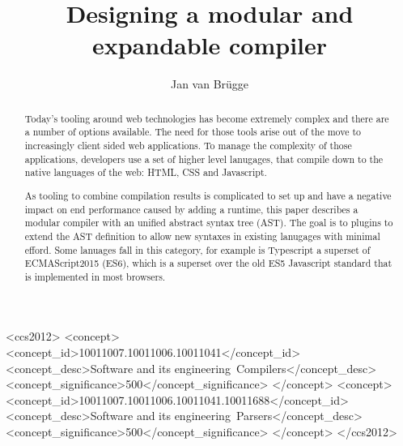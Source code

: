\documentclass[sigconf]{acmart}
\begin{document}
\title{Designing a modular and expandable compiler}

\author{Jan van Br\"ugge}

\begin{abstract}
Today's tooling around web technologies has become extremely complex and there are a number of options available. The need for those tools arise out of the move to increasingly client sided web applications. To manage the complexity of those applications, developers use a set of higher level lanugages, that compile down to the native languages of the web: HTML, CSS and Javascript.

    As tooling to combine compilation results is complicated to set up and have a negative impact on end performance caused by adding a runtime, this paper describes a modular compiler with an unified abstract syntax tree (AST). The goal is to plugins to extend the AST definition to allow new syntaxes in existing lanugages with minimal efford. Some lanuages fall in this category, for example is Typescript a superset of ECMAScript2015 (ES6), which is a superset over the old ES5 Javascript standard that is implemented in most browsers.
\end{abstract}

%
%
\begin{CCSXML}
<ccs2012>
<concept>
<concept_id>10011007.10011006.10011041</concept_id>
<concept_desc>Software and its engineering~Compilers</concept_desc>
<concept_significance>500</concept_significance>
</concept>
<concept>
<concept_id>10011007.10011006.10011041.10011688</concept_id>
<concept_desc>Software and its engineering~Parsers</concept_desc>
<concept_significance>500</concept_significance>
</concept>
</ccs2012>
\end{CCSXML}





\maketitle





\end{document}
